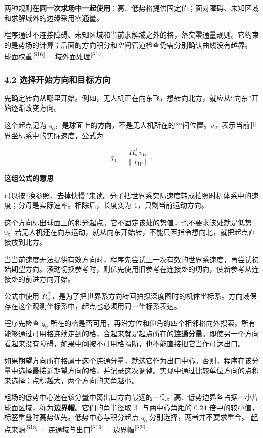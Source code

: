 \documentclass[12pt,a4paper]{article}
\numberwithin{equation}{topic}
\newcommand{\sourceref}[2]{\hyperlink{source-#1}{#2\textsuperscript{[#1]}}}
\begin{document}
两种规则\textbf{在同一次求场中一起使用}：高、低势格提供固定值；面对障碍、未知区域和求解域外的边缘采用零通量。

程序通过不连接障碍、未知区域和当前求解域之外的格，落实零通量规则。它约束的是势场的计算；后面的方向积分和空间管道检查仍需分别确认曲线没有越界。 \sourceref{S16}{球面权重} · \sourceref{S17}{域外面处理}

\subsubsection*{4.2 选择开始方向和目标方向}

先确定转向从哪里开始。例如，无人机正在向东飞，想转向北方，就应从“向东”开始逐渐改变方向。

这个起点记为 \(q_0\)，是球面上的\textbf{方向}，不是无人机所在的空间位置。\(v_W\) 表示当前世界坐标系中的实际速度，公式为

\begin{equation}
\label{eq:start}
q_0=\frac{R_o^\top v_W}{\|v_W\|}.
\end{equation}

\noindent\textbf{这组公式的意思}\par\nobreak
可以按“换参照、去掉快慢”来读。分子把世界系实际速度转成拍照时机体系中的速度；分母是实际速率。相除后，长度变为 1，只剩当前运动方向。

这个方向标出球面上的积分起点。它不固定该处的势值，也不要求该处就是低势 0。若无人机还在向东运动，就从向东开始转，不能只因指令想向北，就把起点直接放到北方。


当当前速度无法提供有效方向时，程序先尝试上一次有效的世界系速度，再尝试初始期望方向。滚动切换参考时，则优先使用旧参考在连接处的切向，使新参考从连接处的前进方向开始。

公式中使用 \(R_o^\top\)，是为了把世界系方向转回拍摄深度图时的机体坐标系。方向域保存在这个观测坐标系中，起点也必须用同一坐标系表达。

程序先检查 \(q_0\) 所在的格是否可用，再沿方位和仰角的四个相邻格向外搜索。所有能够通过可用格连续走到的格，合起来就是起点所在的\textbf{连通分量}。即使另一个方向看起来没有障碍，如果中间被不可用格隔断，也不能直接把它当作可达出口。

如果期望方向所在格属于这个连通分量，就选它作为出口中心。否则，程序在该分量中选择最接近期望方向的格，并记录这次调整。实现中通过比较单位方向的点积来选择；点积越大，两个方向的夹角越小。

粗场的低势中心选在该分量中离出口方向最远的一侧。高、低势边界各占据一小片球面区域，称为\textbf{边界帽}。它们的角半径取 \(3^\circ\) 与两中心角距的 \(0.24\) 倍中的较小值，标签重叠时高势优先。低势中心与积分起点 \(q_0\) 分别选择，两者并不要求重合。 \sourceref{S18}{起点来源} · \sourceref{S19}{连通域与出口} · \sourceref{S20}{边界帽}
\end{document}
